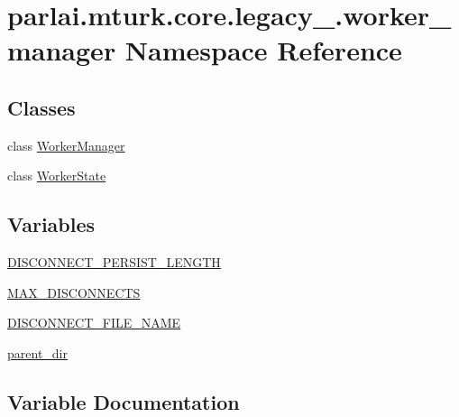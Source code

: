 \hypertarget{namespaceparlai_1_1mturk_1_1core_1_1legacy__2018_1_1worker__manager}{}\section{parlai.\+mturk.\+core.\+legacy\+\_.\+worker\+\_\+manager Namespace Reference}
\label{namespaceparlai_1_1mturk_1_1core_1_1legacy__2018_1_1worker__manager}
\subsection*{Classes}
\begin{DoxyCompactItemize}
\item 
class \hyperlink{classparlai_1_1mturk_1_1core_1_1legacy__2018_1_1worker__manager_1_1WorkerManager}{Worker\+Manager}
\item 
class \hyperlink{classparlai_1_1mturk_1_1core_1_1legacy__2018_1_1worker__manager_1_1WorkerState}{Worker\+State}
\end{DoxyCompactItemize}
\subsection*{Variables}
\begin{DoxyCompactItemize}
\item 
\hyperlink{namespaceparlai_1_1mturk_1_1core_1_1legacy__2018_1_1worker__manager_a90a7e5ffb6866dcc8b5ba2151dcd7036}{D\+I\+S\+C\+O\+N\+N\+E\+C\+T\+\_\+\+P\+E\+R\+S\+I\+S\+T\+\_\+\+L\+E\+N\+G\+TH}
\item 
\hyperlink{namespaceparlai_1_1mturk_1_1core_1_1legacy__2018_1_1worker__manager_a13d42ad6935bbd2be485758b138afab6}{M\+A\+X\+\_\+\+D\+I\+S\+C\+O\+N\+N\+E\+C\+TS}
\item 
\hyperlink{namespaceparlai_1_1mturk_1_1core_1_1legacy__2018_1_1worker__manager_aae517f1ea0530b7035473fe57ba104c6}{D\+I\+S\+C\+O\+N\+N\+E\+C\+T\+\_\+\+F\+I\+L\+E\+\_\+\+N\+A\+ME}
\item 
\hyperlink{namespaceparlai_1_1mturk_1_1core_1_1legacy__2018_1_1worker__manager_af1f6d9454152c5faa3eb50399a955dcb}{parent\+\_\+dir}
\end{DoxyCompactItemize}


\subsection{Variable Documentation}
\mbox{\label{namespaceparlai_1_1mturk_1_1core_1_1legacy__2018_1_1worker__manager_aae517f1ea0530b7035473fe57ba104c6}} 
